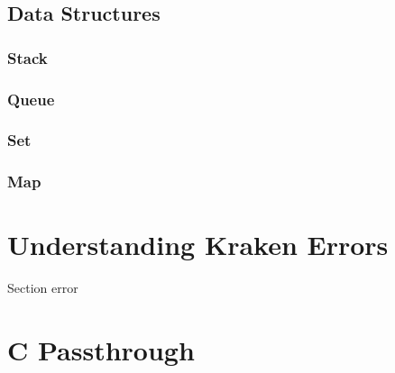 \documentclass{article}
\begin{document}
  \subsection{Data Structures}
    \subsubsection{Stack}
    \subsubsection{Queue}
    \subsubsection{Set}
    \subsubsection{Map}
\section{Understanding Kraken Errors}
  Section error
\section{C Passthrough}
\end{document}
